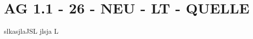 \section{AG 1.1 - 26 - NEU - LT - QUELLE}

\begin{beispiel}[AG 1.1]{1}
slkasjlaJSL jlsja L
\end{beispiel}